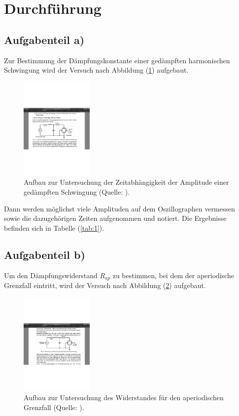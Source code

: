 \newpage
\section{Durchführung}
\subsection{Aufgabenteil a)}
Zur Bestimmung der Dämpfungskonstante einer gedämpften harmonischen Schwingung wird der Versuch nach Abbildung (\ref{fig:aufbaua}) aufgebaut.

\begin{figure}
    \centering
       \includegraphics[height=5cm]{aufbaua.pdf}
       \caption{Aufbau zur Untersuchung der Zeitabhängigkeit der Amplitude einer gedämpften Schwingung (Quelle: \cite{V354}).}
       \label{fig:aufbaua}
\end{figure}

\noindent
Dann werden möglichst viele Amplituden auf dem Oszillographen vermessen sowie die dazugehörigen Zeiten aufgenommen und notiert.
Die Ergebnisse befinden sich in Tabelle (\ref{tab:1}).

\subsection{Aufgabenteil b)}
Um den Dämpfungswiderstand $R_{ap}$ zu bestimmen, 
bei dem der aperiodische Grenzfall eintritt,
wird der Versuch nach Abbildung (\ref{fig:aufbaub}) aufgebaut.

\begin{figure}
    \centering
       \includegraphics[height=5cm]{aufbaub.pdf}
       \caption{Aufbau zur Untersuchung des Widerstandes für den aperiodischen Grenzfall (Quelle: \cite{V354}).}
       \label{fig:aufbaub}
\end{figure}

